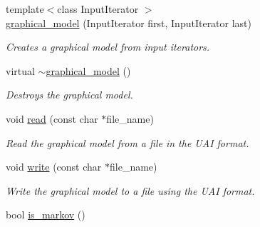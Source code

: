 \begin{DoxyCompactItemize}
{\footnotesize template$<$class Input\+Iterator $>$ }\\\hyperlink{classmerlin_1_1graphical__model_a337d8312dc3d7d8107ea6f7ea6ed435c}{graphical\+\_\+model} (Input\+Iterator first, Input\+Iterator last)
\begin{DoxyCompactList}\small\item\em Creates a graphical model from input iterators. \end{DoxyCompactList}\item 
virtual \hyperlink{classmerlin_1_1graphical__model_a7eed9741a60c050ed1cc0b13602e0a3a}{$\sim$graphical\+\_\+model} ()\hypertarget{classmerlin_1_1graphical__model_a7eed9741a60c050ed1cc0b13602e0a3a}{}\label{classmerlin_1_1graphical__model_a7eed9741a60c050ed1cc0b13602e0a3a}

\begin{DoxyCompactList}\small\item\em Destroys the graphical model. \end{DoxyCompactList}\item 
void \hyperlink{classmerlin_1_1graphical__model_ad67d810e65b40a32f5569d7f82cdfba5}{read} (const char $\ast$file\+\_\+name)
\begin{DoxyCompactList}\small\item\em Read the graphical model from a file in the U\+AI format. \end{DoxyCompactList}\item 
void \hyperlink{classmerlin_1_1graphical__model_a0181edae3b186662262348f4e321e775}{write} (const char $\ast$file\+\_\+name)
\begin{DoxyCompactList}\small\item\em Write the graphical model to a file using the U\+AI format. \end{DoxyCompactList}\item 
bool \hyperlink{classmerlin_1_1graphical__model_aa80358139df9a4e65b659cb04896bc1f}{is\+\_\+markov} ()\hypertarget{classmerlin_1_1graphical__model_aa80358139df9a4e65b659cb04896bc1f}{}\label{classmerlin_1_1graphical__model_aa80358139df9a4e65b659cb04896bc1f}


\end{DoxyCompactItemize}
